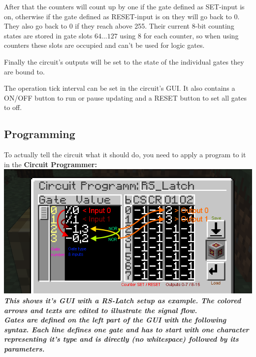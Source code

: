 \documentclass[11pt]{article} %
\begin{document}
After that the counters will count up by one if the gate defined as SET-input is on, otherwise if the gate defined as RESET-input is on they will go back to 0. They also go back to 0 if they reach above 255. Their current 8-bit counting states are stored in gate slots $64\dots127$ using 8 for each counter, so when using counters these slots are occupied and can't be used for logic gates.

Finally the circuit's outputs will be set to the state of the individual gates they are bound to.

The operation tick interval can be set in the circuit's GUI. It also contains a ON/OFF button to run or pause updating and a RESET button to set all gates to off.

\subsection{Programming}
To actually tell the circuit what it should do, you need to apply a program to it in the \bf Circuit Programmer\rm :\\
\includegraphics[width = \textwidth]{programmer_gui}\\
\it This shows it's GUI with a RS-Latch setup as example. The colored arrows and texts are edited to illustrate the signal flow. \rm\\
Gates are defined on the left part of the GUI with the following syntax. Each line defines one gate and has to start with one character representing it's type and is directly (no whitespace) followed by its parameters. 
\end{document}
